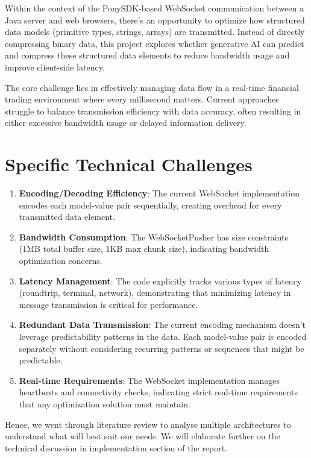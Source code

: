 \documentclass[a4paper, 11pt, twoside, openright]{report}
\begin{document}
Within the context of the PonySDK-based WebSocket communication between a Java server and web browsers, there's an opportunity to optimize how structured data models (primitive types, strings, arrays) are transmitted. Instead of directly compressing binary data, this project explores whether generative AI can predict and compress these structured data elements to reduce bandwidth usage and improve client-side latency.

The core challenge lies in effectively managing data flow in a real-time financial trading environment where every millisecond matters. Current approaches struggle to balance transmission efficiency with data accuracy, often resulting in either excessive bandwidth usage or delayed information delivery.

\section{Specific Technical Challenges}

\begin{enumerate}
    \item \textbf{Encoding/Decoding Efficiency}: The current WebSocket implementation encodes each model-value pair sequentially, creating overhead for every transmitted data element.

    \item \textbf{Bandwidth Consumption}: The WebSocketPusher has size constraints (1MB total buffer size, 1KB max chunk size), indicating bandwidth optimization concerns.

    \item \textbf{Latency Management}: The code explicitly tracks various types of latency (roundtrip, terminal, network), demonstrating that minimizing latency in message transmission is critical for performance.

    \item \textbf{Redundant Data Transmission}: The current encoding mechanism doesn't leverage predictability patterns in the data. Each model-value pair is encoded separately without considering recurring patterns or sequences that might be predictable.

    \item \textbf{Real-time Requirements}: The WebSocket implementation manages heartbeats and connectivity checks, indicating strict real-time requirements that any optimization solution must maintain.
\end{enumerate}

\noindent
Hence, we went through literature review to analyse multiple architectures to understand what will best suit our needs.
We will elaborate further on the technical discussion in implementation section of the report.
\end{document}

